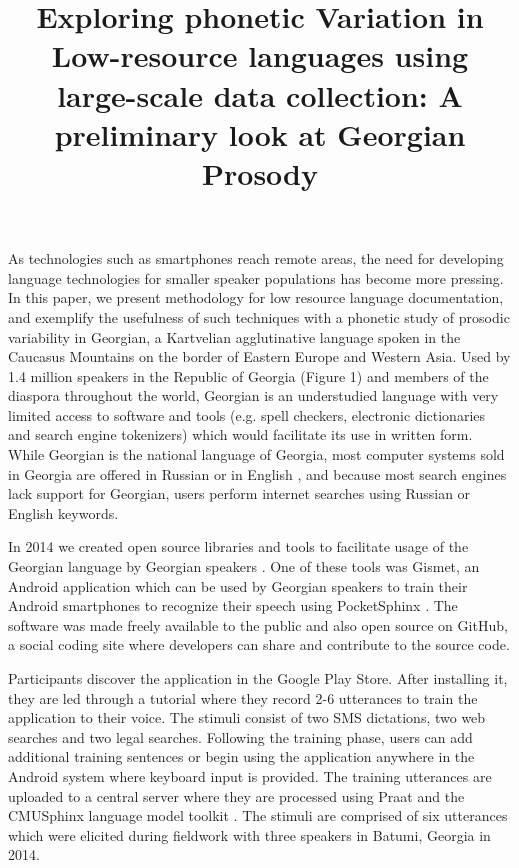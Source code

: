 \documentclass[12pt]{amsart}
\begin{document}
\title{ E\MakeLowercase{xploring} p\MakeLowercase{honetic} V\MakeLowercase{ariation} \MakeLowercase{in} L\MakeLowercase{ow}-r\MakeLowercase{esource} l\MakeLowercase{anguages} u\MakeLowercase{sing} l\MakeLowercase{arge}-s\MakeLowercase{cale} d\MakeLowercase{ata} c\MakeLowercase{ollection}: A p\MakeLowercase{reliminary} l\MakeLowercase{ook} \MakeLowercase{at} G\MakeLowercase{eorgian} P\MakeLowercase{rosody} }
\maketitle

\vspace{-0.05in}

As technologies such as smartphones reach remote areas, the need for
developing language technologies for smaller speaker populations has
become more pressing. In this paper, we present methodology for low resource
language documentation, and exemplify the usefulness of such techniques with a
phonetic study of prosodic variability in Georgian, a Kartvelian agglutinative
language spoken in the Caucasus Mountains on the border of Eastern Europe and
Western Asia. Used by 1.4 million speakers in the Republic of Georgia (Figure
1) and members of the diaspora throughout the world, Georgian is an
understudied language with very limited access to software and tools (e.g. spell
checkers, electronic dictionaries and search engine tokenizers) which would
facilitate its use in written form. While Georgian is the national language of
Georgia, most computer systems sold in Georgia are offered in Russian or in
English \cite{Sh}, and because most search engines lack support for Georgian,
users perform internet searches using Russian or English keywords.

In 2014 we created open source libraries and tools to facilitate usage of the
Georgian language by Georgian speakers \cite{Du}. One of these tools was Gismet,
an Android application which can be used by Georgian speakers to train their
Android smartphones to recognize their speech using PocketSphinx \cite{Hu}. The
software was made freely available to the public and also open source on GitHub,
a social coding site where developers can share and contribute to the source
code.

Participants discover the application in the Google Play Store. After installing
it, they are led through a tutorial where they record 2-6 utterances to train
the application to their voice. The stimuli consist of two SMS dictations, two
web searches and two legal searches. Following the training phase, users can add
additional training sentences or begin using the application anywhere in the
Android system where keyboard input is provided. The training utterances are
uploaded to a central server where they are processed using Praat \cite{Bo} and
the CMUSphinx language model toolkit \cite{Wa}. The stimuli are comprised of six
utterances which were elicited during fieldwork with three speakers in Batumi,
Georgia in 2014.
\end{document}
